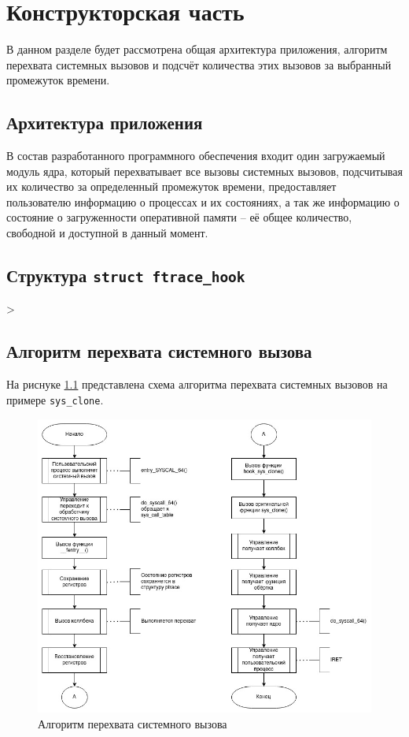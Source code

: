 \chapter{Конструкторская часть}

В данном разделе будет рассмотрена общая архитектура приложения, алгоритм перехвата системных вызовов и подсчёт количества этих вызовов за выбранный промежуток времени.

\section{Архитектура приложения}

В состав разработанного программного обеспечения входит один загружаемый модуль ядра, который перехватывает все вызовы системных вызовов, подсчитывая их количество за определенный промежуток времени, предоставляет пользователю информацию о процессах и их состояниях, а так же информацию о состояние о загруженности оперативной памяти -- её общее количество, свободной и доступной в данный момент.

\section{Структура \texttt{struct ftrace\_hook}}

>

\section{Алгоритм перехвата системного вызова}

На риснуке \ref{fig:ftrace_algo} представлена схема алгоритма перехвата системных вызовов на примере \texttt{sys\_clone}.

\begin{figure}[h]
	\begin{center}
		\includegraphics[scale=0.6]{img/ftrace_algo.jpg}
	\end{center}
	\caption{Алгоритм перехвата системного вызова}
	\label{fig:ftrace_algo}
\end{figure}

